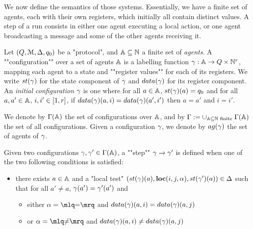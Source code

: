 We now define the semantics of those systems. Essentially, we have a finite set of agents, each with their own registers, which initially all contain distinct values. A step of a run consists in either one agent executing a local action, or one agent broadcasting a message and some of the other agents receiving it.

\begin{definition}[Semantics]
	Let $(Q,\mathcal{M}, \Delta, q_0)$ be a "protocol", and $\mathbb{A} \subseteq \mathbb{N}$ a finite set of \emph{agents}.
	A ""configuration"" over a set of agents $\mathbb{A}$ is a labelling function $\gamma : \mathbb{A} \to Q \times \mathbb{N}^{r}$, mapping each agent to a state and ""register values"" for each of its registers. 
	We write $\st{\config}$ for the state component of $\gamma$ and $\data{\config}$ for its register component.
	An \emph{initial configuration} $\gamma$ is one where for all $a \in \mathbb{A}$, $\st{\config}(a) = q_0$ and for all $a, a' \in \mathbb{A}$, $i, i' \in [1,r]$, if $\data{\config}(a, i) = \data{\config}(a', i')$ then $a=a'$ and $i=i'$.
	
	\AP We denote by $\Gamma(\mathbb{A})$ the set of configurations over $\mathbb{A}$, and by $\Gamma := \cup_{\mathbb{A} \subseteq \mathbb{N} \text{ finite }} \Gamma(\mathbb{A})$ the set of all configurations. Given a configuration $\gamma$, we denote by $\agentsof{\config}$ the set of agents of $\gamma$.
	
	\AP Given two configurations $\gamma, \gamma' \in \Gamma(\mathbb{A})$, a ""step"" $\gamma \xrightarrow{} \gamma'$ is defined when one of the two following conditions is satisfied:
	\begin{itemize}
		\item there exists $a \in \mathbb{A}$ and a "local test" $(\st{\config}(a), \loc{i}{j}{\anact}, \st{\config'}(a)) \in \transitions$ such that for all $a'\neq a$, $\gamma(a') = \gamma'(a')$ and
		\begin{itemize}
			\item either $\anact = \quotemarks{\eqtestact}$ and $\data{\config}(a,i) = \data{\config}(a,j)$
			
			\item or $\anact = \quotemarks{\diseqtestact}$ and $\data{\config}(a,i) \neq \data{\config}(a,j)$
		\end{itemize}
		

\end{itemize}
\end{definition}

